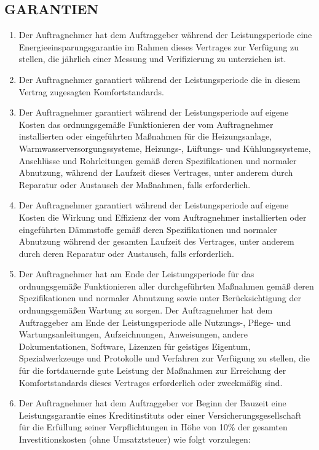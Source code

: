 \begin{multicols}{2}
  \subsection{GARANTIEN}
  \begin{enumerate}
   \item Der Auftragnehmer hat dem Auftraggeber während der Leistungsperiode eine Energieeinsparungsgarantie im Rahmen dieses Vertrages zur Verfügung zu stellen, die jährlich einer Messung und  Verifizierung zu unterziehen ist.
   \item Der Auftragnehmer garantiert während der Leistungsperiode die in diesem Vertrag zugesagten Komfortstandards.
   \item Der Auftragnehmer garantiert während der Leistungsperiode auf eigene Kosten das ordnungsgemäße Funktionieren der vom Auftragnehmer installierten oder eingeführten Maßnahmen für die Heizungsanlage, Warmwasserversorgungssysteme, Heizungs-, Lüftungs- und Kühlungssysteme, Anschlüsse und Rohrleitungen gemäß deren Spezifikationen und normaler Abnutzung, während der Laufzeit dieses Vertrages, unter anderem durch Reparatur oder Austausch der Maßnahmen, falls erforderlich.
   \item Der Auftragnehmer garantiert während der Leistungsperiode auf eigene Kosten die Wirkung und Effizienz der vom Auftragnehmer installierten oder eingeführten Dämmstoffe gemäß deren Spezifikationen und normaler Abnutzung während der gesamten Laufzeit des Vertrages, unter anderem durch deren Reparatur oder Austausch, falls erforderlich.
   \item Der Auftragnehmer hat am Ende der Leistungsperiode für das ordnungsgemäße Funktionieren aller durchgeführten Maßnahmen gemäß deren Spezifikationen und normaler Abnutzung sowie unter Berücksichtigung der ordnungsgemäßen Wartung zu sorgen. Der Auftragnehmer hat dem Auftraggeber am Ende der Leistungsperiode alle Nutzungs-, Pflege- und Wartungsanleitungen, Aufzeichnungen, Anweisungen, andere Dokumentationen, Software, Lizenzen für geistiges Eigentum, Spezialwerkzeuge und Protokolle und Verfahren zur Verfügung zu stellen, die für die fortdauernde gute Leistung der Maßnahmen zur Erreichung der Komfortstandards dieses Vertrages erforderlich oder zweckmäßig sind.
   \item Der Auftragnehmer hat dem Auftraggeber vor Beginn der Bauzeit eine Leistungsgarantie eines Kreditinstituts oder einer Versicherungsgesellschaft für die Erfüllung seiner Verpflichtungen in Höhe von 10\% der gesamten Investitionskosten (ohne Umsatztsteuer) wie folgt vorzulegen:

\end{enumerate}
\end{multicols}
